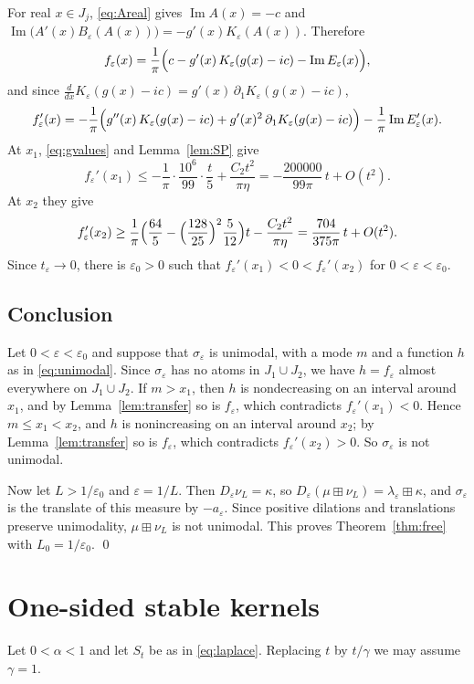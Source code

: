 \documentclass[11pt]{amsart}
\numberwithin{equation}{section}
\theoremstyle{definition}
\theoremstyle{remark}
\renewcommand{\Im}{\operatorname{Im}}
\begin{document}
For real $x\in J_j$, \eqref{eq:Areal} gives $\Im A(x)=-c$ and $\Im\bigl(A'(x)B_\varepsilon(A(x))\bigr)=-g'(x)K_\varepsilon(A(x))$. Therefore
\[
f_\varepsilon(x)=\frac1\pi\Bigl(c-g'(x)\,K_\varepsilon(g(x)-ic)-\Im E_\varepsilon(x)\Bigr),
\]
and since $\frac{d}{dx}K_\varepsilon(g(x)-ic)=g'(x)\,\partial_1K_\varepsilon(g(x)-ic)$,
\begin{equation}\label{eq:fprime}
f_\varepsilon'(x)=-\frac1\pi\Bigl(g''(x)\,K_\varepsilon(g(x)-ic)+g'(x)^2\,\partial_1K_\varepsilon(g(x)-ic)\Bigr)-\frac1\pi\Im E_\varepsilon'(x).
\end{equation}
At $x_1$, \eqref{eq:gvalues} and Lemma~\ref{lem:SP} give
\[
f_\varepsilon'(x_1)\le-\frac1\pi\cdot\frac{10^6}{99}\cdot\frac{t}{5}+\frac{C_2t^2}{\pi\eta}=-\frac{200000}{99\pi}\,t+O(t^2).
\]
At $x_2$ they give
\[
f_\varepsilon'(x_2)\ge\frac1\pi\Bigl(\frac{64}{5}-\Bigl(\frac{128}{25}\Bigr)^{2}\frac5{12}\Bigr)t-\frac{C_2t^2}{\pi\eta}=\frac{704}{375\pi}\,t+O(t^2).
\]
Since $t_\varepsilon\to0$, there is $\varepsilon_0>0$ such that $f_\varepsilon'(x_1)<0<f_\varepsilon'(x_2)$ for $0<\varepsilon<\varepsilon_0$.

\subsection{Conclusion}
Let $0<\varepsilon<\varepsilon_0$ and suppose that $\sigma_\varepsilon$ is unimodal, with a mode $m$ and a function $h$ as in \eqref{eq:unimodal}. Since $\sigma_\varepsilon$ has no atoms in $J_1\cup J_2$, we have $h=f_\varepsilon$ almost everywhere on $J_1\cup J_2$. If $m>x_1$, then $h$ is nondecreasing on an interval around $x_1$, and by Lemma~\ref{lem:transfer} so is $f_\varepsilon$, which contradicts $f_\varepsilon'(x_1)<0$. Hence $m\le x_1<x_2$, and $h$ is nonincreasing on an interval around $x_2$; by Lemma~\ref{lem:transfer} so is $f_\varepsilon$, which contradicts $f_\varepsilon'(x_2)>0$. So $\sigma_\varepsilon$ is not unimodal.

Now let $L>1/\varepsilon_0$ and $\varepsilon=1/L$. Then $D_\varepsilon\nu_L=\kappa$, so $D_\varepsilon(\mu\boxplus\nu_L)=\lambda_\varepsilon\boxplus\kappa$, and $\sigma_\varepsilon$ is the translate of this measure by $-a_\varepsilon$. Since positive dilations and translations preserve unimodality, $\mu\boxplus\nu_L$ is not unimodal. This proves Theorem~\ref{thm:free} with $L_0=1/\varepsilon_0$. \qed

\section{One-sided stable kernels}
Let $0<\alpha<1$ and let $S_t$ be as in \eqref{eq:laplace}. Replacing $t$ by $t/\gamma$ we may assume $\gamma=1$.
\end{document}
